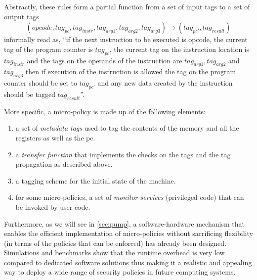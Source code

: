 Abstractly, these rules form a partial function from a set of
input tags to a set of output tags
$$(opcode, tag_{pc},tag_{instr}, tag_{arg1}, tag_{arg2}, tag_{arg3})
\rightarrow (tag_{pc'},tag_{result})$$
informally read as, ``if the next instruction to be executed is opcode, the
current tag of the program counter is $tag_{pc}$, the current tag on the
instruction location is $tag_{instr}$ and the tags on the operands of the
instruction are $tag_{arg1}, tag_{arg2}$ and $tag_{arg3}$ then if execution of
the instruction is allowed the tag on the program counter should be set
to $tag_{pc'}$ and any new data created by the instruction should be tagged
$tag_{result}$''.

More specific, a micro-policy is made up of the following elements:
\begin{enumerate}
\item a set of {\em metadata tags} used to tag the contents of the memory and
all the registers as well as the pc.
\item a {\em transfer function} that implements the checks on the tags and
the tag propagation as described above.
\item a tagging scheme for the initial state of the machine.
\item for some micro-policies, a set of {\em monitor services} (\IE privileged
code) that can be invoked by user code.
\end{enumerate}

Furthermore, as we will see in \cref{sec:pump}, a software-hardware
mechanism that enables the efficient implementation of micro-policies
without sacrificing flexibility (in terms of the policies that can be
enforced) has already been designed. Simulations and benchmarks show
that the runtime overhead is very low compared to dedicated software
solutions thus making it a realistic and appealing way to deploy a
wide range of security policies in future computing systems.


